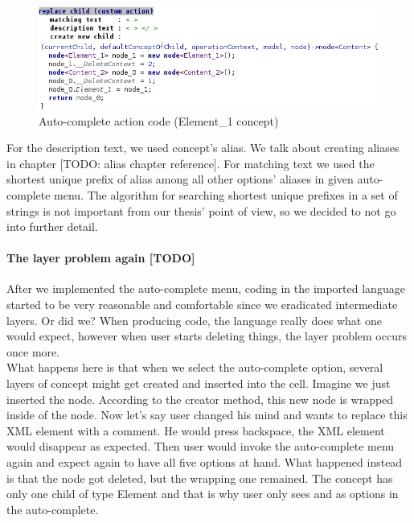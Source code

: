 \begin{figure}[h]
	\centering
	\includegraphics[width=\textwidth]{./img/autocomplete_action.png}
	\caption{Auto-complete action code (Element{\_}1 concept)}
	\label{fig:autocomplete_action}
\end{figure}

For the description text, we used concept's alias. We talk about creating aliases in chapter [TODO: alias chapter reference].
For matching text we used the shortest unique prefix of alias among all other options' aliases in given auto-complete menu.
The algorithm for searching shortest unique prefixes in a set of strings is not important from our thesis' point of view, so we decided to not go into further detail.

\paragraph{The layer problem again [TODO]}

After we implemented the auto-complete menu, coding in the imported language started to be very reasonable and comfortable since we eradicated intermediate layers. Or did we? When producing code, the language really does what one would expect, however when user starts deleting things, the layer problem occurs once more.
\\

What happens here is that when we select the auto-complete option, several layers of concept might get created and inserted into the cell. Imagine we just inserted the  node. According to the creator method, this new node is wrapped inside of the  node. Now let's say user changed his mind and wants to replace this XML element with a comment. He would press backspace, the XML element would disappear as expected. Then user would invoke the auto-complete menu again and expect again to have all five options at hand. What happened instead is that the  node got deleted, but the wrapping  one remained. The  concept has only one child of type Element and that is why user only sees  and  as options in the auto-complete.

